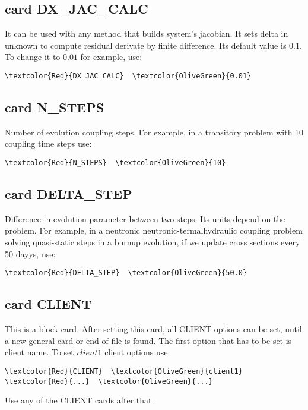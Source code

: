 \subsection{card DX_JAC_CALC}
It can be used with any method that builds system's jacobian. It sets delta in unknown to compute residual derivate by finite difference. Its default value is $0.1$. To change it to $0.01$ for example, use:
\begin{Verbatim}[frame=single,commandchars=\\\{\}]
\textcolor{Red}{DX_JAC_CALC}  \textcolor{OliveGreen}{0.01}
\end{Verbatim}

\subsection{card N_STEPS}
Number of evolution coupling steps. For example, in a transitory problem with 10 coupling time steps use:
\begin{Verbatim}[frame=single,commandchars=\\\{\}]
\textcolor{Red}{N_STEPS}  \textcolor{OliveGreen}{10}
\end{Verbatim}

\subsection{card DELTA_STEP}
Difference in evolution parameter between two steps. Its units depend on the problem. For example, in a neutronic neutronic-termalhydraulic coupling problem solving quasi-static steps in a burnup evolution, if we update cross sections every 50 dayys, use:
\begin{Verbatim}[frame=single,commandchars=\\\{\}]
\textcolor{Red}{DELTA_STEP}  \textcolor{OliveGreen}{50.0}
\end{Verbatim}

\subsection{card CLIENT}
This is a block card. After setting this card, all CLIENT options can be set, until a new general card or end of file is found. The first option that has to be set is client name. To set $client1$ client options use:
\begin{Verbatim}[frame=single,commandchars=\\\{\}]
\textcolor{Red}{CLIENT}  \textcolor{OliveGreen}{client1}
\textcolor{Red}{...}  \textcolor{OliveGreen}{...}
\end{Verbatim}
Use any of the CLIENT cards after that.

